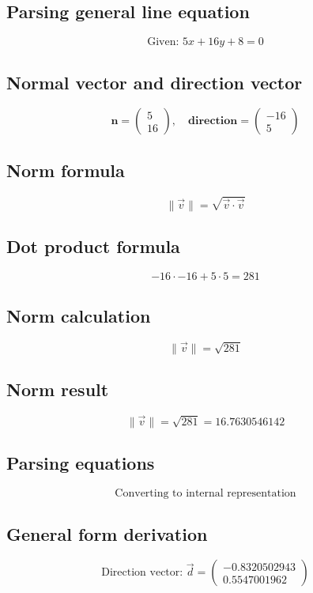\documentclass{article}
\begin{document}
\subsection*{ \vspace{1em} Parsing general line equation}
\[
\text{Given: } 5x + 16y + 8 = 0
\]
\subsection*{ \vspace{1em} Normal vector and direction vector}
\[
\mathbf{n} = \begin{pmatrix}5 \\ 16\end{pmatrix}, \quad
           \mathbf{direction} = \begin{pmatrix}-16 \\ 5\end{pmatrix}
\]
\subsection*{ \vspace{1em} Norm formula}
\[
\|\vec{v}\| = \sqrt{\vec{v} \cdot \vec{v}}
\]
\subsection*{ \vspace{1em} Dot product formula}
\[
-16 \cdot -16 + 5 \cdot 5 = 281
\]
\subsection*{ \vspace{1em} Norm calculation}
\[
\|\vec{v}\| = \sqrt{281}
\]
\subsection*{ \vspace{1em} Norm result}
\[
\|\vec{v}\| = \sqrt{281} = 16.7630546142
\]
\subsection*{ \vspace{1em} Parsing equations}
\[
\text{Converting to internal representation}
\]
\subsection*{ \vspace{1em} General form derivation}
\[
\text{Direction vector: } \vec{d} = \begin{pmatrix}-0.8320502943 \\ 0.5547001962\end{pmatrix}
\]
\end{document}
